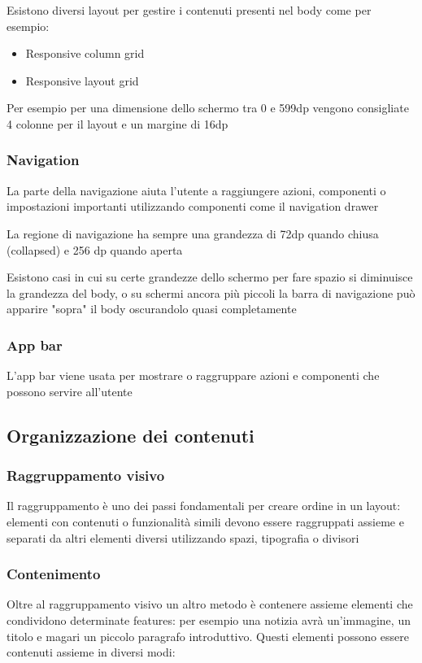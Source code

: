 \documentclass[12pt, a4paper]{report}
\begin{document}
		  Esistono diversi layout per gestire i contenuti presenti nel body come per esempio:
		  \begin{itemize}
			\item Responsive column grid
			\item Responsive layout grid
		  \end{itemize}

		  Per esempio per una dimensione dello schermo tra 0 e 599dp vengono consigliate 4 colonne per il layout e un margine di 16dp
		\subsubsection{Navigation}
		  La parte della navigazione aiuta l'utente a raggiungere azioni, componenti o impostazioni importanti utilizzando componenti come il navigation drawer 

		  La regione di navigazione ha sempre una grandezza di 72dp quando chiusa (collapsed) e 256 dp quando aperta

		  Esistono casi in cui su certe grandezze dello schermo per fare spazio si diminuisce la grandezza del body, o su schermi ancora più piccoli la barra di navigazione può apparire "sopra" il body oscurandolo quasi completamente
		\subsubsection{App bar}
		  L'app bar viene usata per mostrare o raggruppare azioni  e componenti che possono servire all'utente

	\subsection{Organizzazione dei contenuti }
		\subsubsection{Raggruppamento visivo}
		  Il raggruppamento è uno dei passi fondamentali per creare ordine in un layout: elementi con contenuti o funzionalità simili devono essere raggruppati assieme e separati da altri elementi diversi utilizzando spazi, tipografia o divisori
		\subsubsection{Contenimento}
		  Oltre al raggruppamento visivo un altro metodo è contenere assieme elementi che condividono determinate features:
		  per esempio una notizia avrà un'immagine, un titolo e magari un piccolo paragrafo introduttivo. Questi elementi possono essere contenuti assieme in diversi modi:
\end{document}
